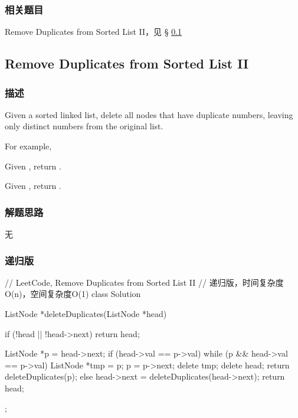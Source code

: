 \subsubsection{相关题目}

\begindot
\item Remove Duplicates from Sorted List II，见 \S 
\ref{sec:remove-duplicates-from-sorted-list-ii}
\myenddot


\subsection{Remove Duplicates from Sorted List II}
\label{sec:remove-duplicates-from-sorted-list-ii}


\subsubsection{描述}
Given a sorted linked list, delete all nodes that have duplicate numbers, 
leaving only distinct numbers from the original list.

For example,

Given , return .

Given , return .


\subsubsection{解题思路}
无


\subsubsection{递归版}
\begin{Code}
	// LeetCode, Remove Duplicates from Sorted List II
	// 递归版，时间复杂度O(n)，空间复杂度O(1)
	class Solution {
		ListNode *deleteDuplicates(ListNode *head) {
			if (!head || !head->next) return head;
			
			ListNode *p = head->next;
			if (head->val == p->val) {
				while (p && head->val == p->val) {
					ListNode *tmp = p;
					p = p->next;
					delete tmp;
				}
				delete head;
				return deleteDuplicates(p);
			} else {
			head->next = deleteDuplicates(head->next);
			return head;
		}
	}
};
\end{Code}


